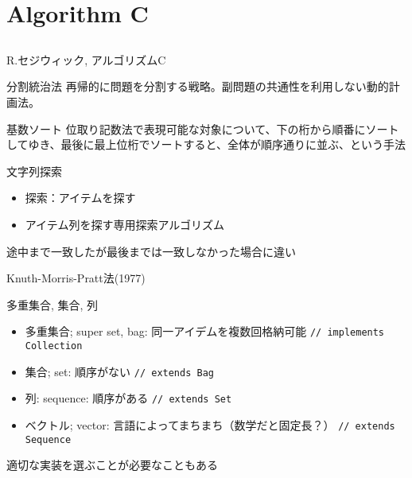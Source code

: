 \documentclass{beamer}
\subtitle{appendix}
\begin{document}
\begin{frame}[fragile]{}
\titlepage
\end{frame}

\section{Algorithm C}		%
\subsection{}

\begin{frame}[fragile]{R.セジウィック, アルゴリズムC}{
\href{https://www.amazon.co.jp/セジウィック-アルゴリズムC-第1-4部-―基礎・データ構造・整列・探索―-ロバート/dp/4764905604/ref=sr_1_2_sspa}{}}

\begin{block}{分割統治法}
再帰的に問題を分割する戦略。副問題の共通性を利用しない動的計画法。
\end{block}

\begin{block}{基数ソート}
位取り記数法で表現可能な対象について、下の桁から順番にソートしてゆき、最後に最上位桁でソートすると、全体が順序通りに並ぶ、という手法
\end{block}
\end{frame}

\begin{frame}[fragile]{文字列探索}{}
\begin{itemize}%
\item 探索：アイテムを探す
\item アイテム列を探す専用探索アルゴリズム
\end{itemize}

\vfill
途中まで一致したが最後までは一致しなかった場合に違い

\vfill
Knuth-Morris-Pratt法(1977)
\end{frame}

\begin{frame}[fragile]{多重集合, 集合, 列}{}
\begin{itemize}\itemsep8pt
\item 多重集合; super set, bag: 同一アイデムを複数回格納可能 \texttt{// implements Collection}
\item 集合; set: 順序がない \texttt{// extends Bag}
\item 列: sequence: 順序がある \texttt{// extends Set}
\item ベクトル; vector: 言語によってまちまち（数学だと固定長？） \texttt{// extends Sequence}
\end{itemize}
\vfill
適切な実装を選ぶことが必要なこともある
\end{frame}
\end{document}
